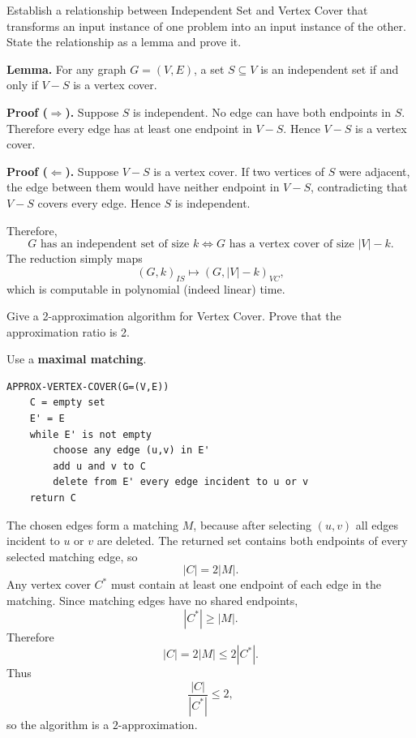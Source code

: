 \documentclass[11pt,a4paper]{article}
\begin{document}
\begin{qaquestion}
Establish a relationship between Independent Set and Vertex Cover that transforms an input instance of one problem into an input instance of the other. State the relationship as a lemma and prove it.
\end{qaquestion}
\begin{qaanswer}[Answer 6(b)]
\textbf{Lemma.} For any graph \(G=(V,E)\), a set \(S\subseteq V\) is an independent set if and only if \(V-S\) is a vertex cover.

\textbf{Proof (\(\Rightarrow\)).} Suppose \(S\) is independent. No edge can have both endpoints in \(S\). Therefore every edge has at least one endpoint in \(V-S\). Hence \(V-S\) is a vertex cover.

\textbf{Proof (\(\Leftarrow\)).} Suppose \(V-S\) is a vertex cover. If two vertices of \(S\) were adjacent, the edge between them would have neither endpoint in \(V-S\), contradicting that \(V-S\) covers every edge. Hence \(S\) is independent.

Therefore,
\[
\boxed{G\text{ has an independent set of size }k
\iff
G\text{ has a vertex cover of size }|V|-k.}
\]
The reduction simply maps
\[
(G,k)_{IS}\longmapsto(G,|V|-k)_{VC},
\]
which is computable in polynomial (indeed linear) time.
\end{qaanswer}

\begin{qaquestion}
Give a 2-approximation algorithm for Vertex Cover. Prove that the approximation ratio is 2.
\end{qaquestion}
\begin{qaanswer}[Answer 6(c)]
Use a \textbf{maximal matching}.

\begin{lstlisting}
APPROX-VERTEX-COVER(G=(V,E))
    C = empty set
    E' = E
    while E' is not empty
        choose any edge (u,v) in E'
        add u and v to C
        delete from E' every edge incident to u or v
    return C
\end{lstlisting}

The chosen edges form a matching \(M\), because after selecting \((u,v)\) all edges incident to \(u\) or \(v\) are deleted. The returned set contains both endpoints of every selected matching edge, so
\[
|C|=2|M|.
\]
Any vertex cover \(C^*\) must contain at least one endpoint of each edge in the matching. Since matching edges have no shared endpoints,
\[
|C^*|\ge |M|.
\]
Therefore
\[
|C|=2|M|\le2|C^*|.
\]
Thus
\[
\boxed{\frac{|C|}{|C^*|}\le2},
\]
so the algorithm is a \(\boxed{2\text{-approximation}}\).
\end{qaanswer}
\end{document}
